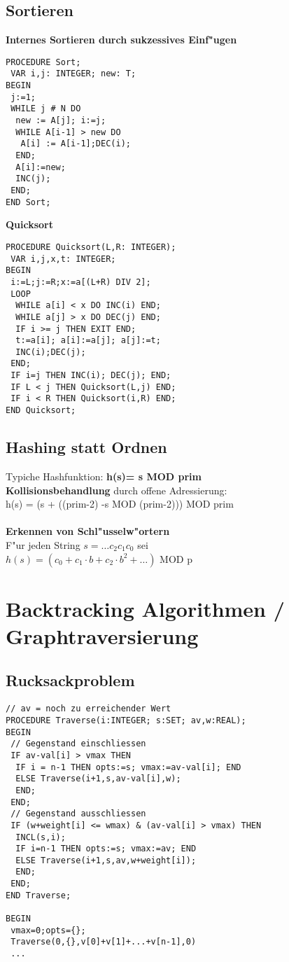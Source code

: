 \documentclass[10pt, a4paper, twocolumn]{scrartcl}
\begin{document}
\subsection{Sortieren}

{\bf Internes Sortieren durch sukzessives Einf"ugen}

\begin{verbatim}
PROCEDURE Sort;
 VAR i,j: INTEGER; new: T;
BEGIN
 j:=1;
 WHILE j # N DO
  new := A[j]; i:=j;
  WHILE A[i-1] > new DO
   A[i] := A[i-1];DEC(i);
  END;
  A[i]:=new;
  INC(j);
 END;
END Sort;
\end{verbatim}

{\bf Quicksort}

\begin{verbatim}
PROCEDURE Quicksort(L,R: INTEGER);
 VAR i,j,x,t: INTEGER;
BEGIN
 i:=L;j:=R;x:=a[(L+R) DIV 2];
 LOOP
  WHILE a[i] < x DO INC(i) END;
  WHILE a[j] > x DO DEC(j) END;
  IF i >= j THEN EXIT END;
  t:=a[i]; a[i]:=a[j]; a[j]:=t;
  INC(i);DEC(j);
 END;
 IF i=j THEN INC(i); DEC(j); END;
 IF L < j THEN Quicksort(L,j) END;
 IF i < R THEN Quicksort(i,R) END;
END Quicksort;
\end{verbatim}


\subsection{Hashing statt Ordnen}

Typiche Hashfunktion: {\bf h(s)= s MOD prim}\\
{\bf Kollisionsbehandlung} durch offene Adressierung:\\
h(s) = (s + ((prim-2) -s MOD (prim-2))) MOD prim\\\\

{\bf Erkennen von Schl"usselw"ortern}\\
F"ur jeden String $s=\ldots c_2 c_1 c_0$ sei\\
$h(s)=(c_0 + c_1\cdotp b + c_2\cdotp b^2 + \ldots)$ MOD p

\section{Backtracking Algorithmen / Graphtraversierung}

\subsection{Rucksackproblem}
\begin{verbatim}
// av = noch zu erreichender Wert
PROCEDURE Traverse(i:INTEGER; s:SET; av,w:REAL);
BEGIN
 // Gegenstand einschliessen
 IF av-val[i] > vmax THEN
  IF i = n-1 THEN opts:=s; vmax:=av-val[i]; END
  ELSE Traverse(i+1,s,av-val[i],w);
  END;
 END;
 // Gegenstand ausschliessen
 IF (w+weight[i] <= wmax) & (av-val[i] > vmax) THEN
  INCL(s,i);
  IF i=n-1 THEN opts:=s; vmax:=av; END
  ELSE Traverse(i+1,s,av,w+weight[i]);
  END;
 END;
END Traverse;

BEGIN
 vmax=0;opts={};
 Traverse(0,{},v[0]+v[1]+...+v[n-1],0)
 ...
\end{verbatim}
\end{document}
